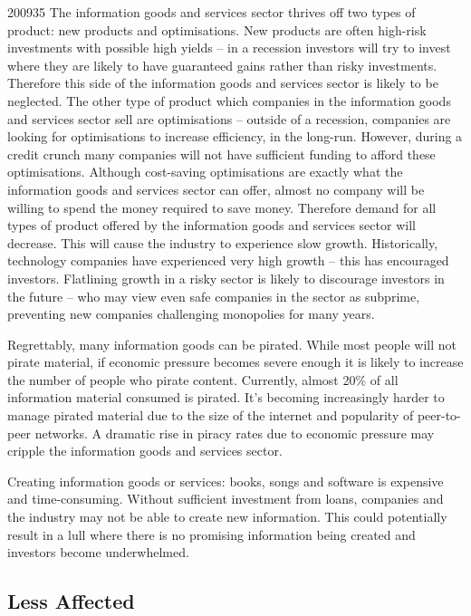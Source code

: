 \documentclass[a4paper]{article}
\begin{document}
\begin{examquestion}{2009}{3}{5}
The information goods and services sector thrives off two types of product:
new products and optimisations. New products are often high-risk investments
with possible high yields -- in a recession investors will try to invest
where they are likely to have guaranteed gains rather than risky investments.
Therefore this side of the information goods and services sector is likely
to be neglected. The other type of product which companies in the
information goods and services sector sell are optimisations -- outside of a
recession, companies are looking for optimisations to increase efficiency,
in the long-run. However, during a credit crunch many companies will not
have sufficient funding to afford these optimisations. Although cost-saving
optimisations are exactly what the information goods and services sector can
offer, almost no company will be willing to spend the money required to save
money. Therefore demand for all types of product offered by the information
goods and services sector will decrease. This will cause the industry to
experience slow growth. Historically, technology companies have experienced
very high growth -- this has encouraged investors. Flatlining growth in a
risky sector is likely to discourage investors in the future -- who may view
even safe companies in the sector as subprime, preventing new
companies challenging monopolies for many years.

Regrettably, many information goods can be pirated. While most people will
not pirate material, if economic pressure becomes severe enough it is likely
to increase the number of people who pirate content. Currently, almost 20\% of
all information material consumed is pirated. It's becoming increasingly
harder to manage pirated material due to the size of the internet and
popularity of peer-to-peer networks. A dramatic rise in piracy rates due to
economic pressure may cripple the information goods and services sector.

Creating information goods or services: books, songs and software is
expensive and time-consuming. Without sufficient investment from loans,
companies and the industry may not be able to create new information. This
could potentially result in a lull where there is no promising information
being created and investors become underwhelmed.

\subsection*{Less Affected}


\end{examquestion}
\end{document}
